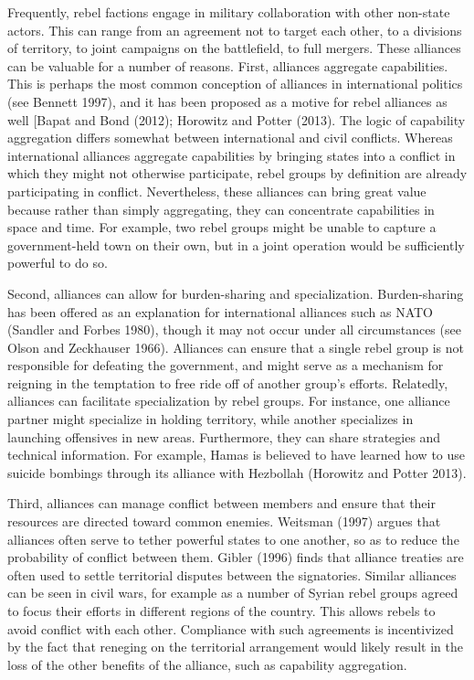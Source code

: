 \documentclass[12pt,]{article}
\begin{document}
Frequently, rebel factions engage in military collaboration with other
non-state actors. This can range from an agreement not to target each
other, to a divisions of territory, to joint campaigns on the
battlefield, to full mergers. These alliances can be valuable for a
number of reasons. First, alliances aggregate capabilities. This is
perhaps the most common conception of alliances in international
politics (see Bennett 1997), and it has been proposed as a motive for
rebel alliances as well {[}Bapat and Bond (2012); Horowitz and Potter
(2013). The logic of capability aggregation differs somewhat between
international and civil conflicts. Whereas international alliances
aggregate capabilities by bringing states into a conflict in which they
might not otherwise participate, rebel groups by definition are already
participating in conflict. Nevertheless, these alliances can bring great
value because rather than simply aggregating, they can concentrate
capabilities in space and time. For example, two rebel groups might be
unable to capture a government-held town on their own, but in a joint
operation would be sufficiently powerful to do so.

Second, alliances can allow for burden-sharing and specialization.
Burden-sharing has been offered as an explanation for international
alliances such as NATO (Sandler and Forbes 1980), though it may not
occur under all circumstances (see Olson and Zeckhauser 1966). Alliances
can ensure that a single rebel group is not responsible for defeating
the government, and might serve as a mechanism for reigning in the
temptation to free ride off of another group's efforts. Relatedly,
alliances can facilitate specialization by rebel groups. For instance,
one alliance partner might specialize in holding territory, while
another specializes in launching offensives in new areas. Furthermore,
they can share strategies and technical information. For example, Hamas
is believed to have learned how to use suicide bombings through its
alliance with Hezbollah (Horowitz and Potter 2013).

Third, alliances can manage conflict between members and ensure that
their resources are directed toward common enemies. Weitsman (1997)
argues that alliances often serve to tether powerful states to one
another, so as to reduce the probability of conflict between them.
Gibler (1996) finds that alliance treaties are often used to settle
territorial disputes between the signatories. Similar alliances can be
seen in civil wars, for example as a number of Syrian rebel groups
agreed to focus their efforts in different regions of the country. This
allows rebels to avoid conflict with each other. Compliance with such
agreements is incentivized by the fact that reneging on the territorial
arrangement would likely result in the loss of the other benefits of the
alliance, such as capability aggregation.
\end{document}
